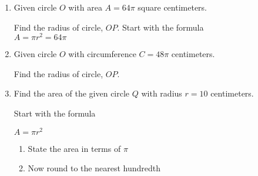 \begin{enumerate}
\item Given circle $O$ with area $A=64 \pi$ square centimeters.
  \begin{multicols}{2}
  \raggedcolumns
  Find the radius of circle, $OP$. Start with the formula\\[0.5cm]
  $A = \pi r^2 = 64 \pi$ \vspace{1.7cm}

  \end{multicols}
  
\item Given circle $O$ with circumference $C=48 \pi$ centimeters.
  \begin{multicols}{2}
  \raggedcolumns
  Find the radius of circle, $OP$. \vspace{1.7cm}
  \end{multicols}

\newpage
\item Find the area of the given circle $Q$ with radius $r=10$ centimeters.
  \begin{multicols}{2}
  \raggedcolumns
  Start with the formula \par \medskip
  $A = \pi r^2$ 
  \begin{enumerate}
    \item State the area in terms of $\pi$ \vspace{1.7cm}
    \item Now round to the nearest hundredth
  \end{enumerate}
  \end{multicols}
  

\end{enumerate}
